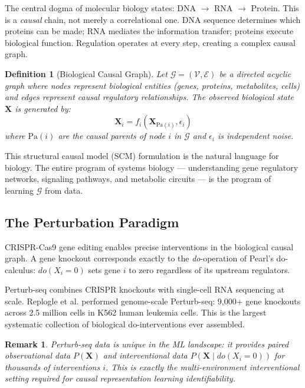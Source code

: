 \documentclass[11pt]{article}
\newtheorem{definition}{Definition}
\newtheorem{remark}{Remark}
\begin{document}
The central dogma of molecular biology states: DNA $\rightarrow$ RNA $\rightarrow$ Protein. This is a \emph{causal} chain, not merely a correlational one. DNA sequence determines which proteins can be made; RNA mediates the information transfer; proteins execute biological function. Regulation operates at every step, creating a complex causal graph.

\begin{definition}[Biological Causal Graph]
Let $\mathcal{G} = (\mathcal{V}, \mathcal{E})$ be a directed acyclic graph where nodes represent biological entities (genes, proteins, metabolites, cells) and edges represent causal regulatory relationships. The observed biological state $\mathbf{X}$ is generated by:
$$\mathbf{X}_i = f_i(\mathbf{X}_{\mathrm{Pa}(i)}, \epsilon_i)$$
where $\mathrm{Pa}(i)$ are the causal parents of node $i$ in $\mathcal{G}$ and $\epsilon_i$ is independent noise.
\end{definition}

This structural causal model (SCM) formulation \citep{pearl2009causality} is the natural language for biology. The entire program of systems biology --- understanding gene regulatory networks, signaling pathways, and metabolic circuits --- is the program of learning $\mathcal{G}$ from data.

\subsection{The Perturbation Paradigm}

CRISPR-Cas9 gene editing enables precise interventions in the biological causal graph. A gene knockout corresponds exactly to the \emph{do}-operation of Pearl's do-calculus: $do(X_i = 0)$ sets gene $i$ to zero regardless of its upstream regulators.

Perturb-seq \citep{dixit2016perturb} combines CRISPR knockouts with single-cell RNA sequencing at scale. Replogle et al. \citep{replogle2022mapping} performed genome-scale Perturb-seq: 9,000+ gene knockouts across 2.5 million cells in K562 human leukemia cells. This is the largest systematic collection of biological do-interventions ever assembled.

\begin{remark}
Perturb-seq data is unique in the ML landscape: it provides paired observational data $P(\mathbf{X})$ and interventional data $P(\mathbf{X} \mid do(X_i = 0))$ for thousands of interventions $i$. This is exactly the multi-environment interventional setting required for causal representation learning identifiability.
\end{remark}
\end{document}
